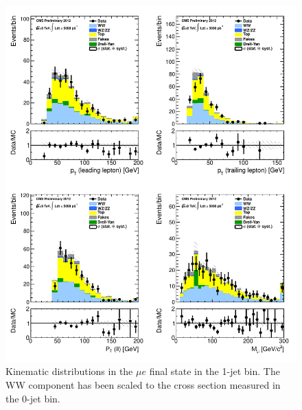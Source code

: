 \begin{figure}[!hbtp]
\centering
\includegraphics[width=1\textwidth]{figures/ww_analysis20_0_ALL_me_1j.pdf} %
\caption{Kinematic distributions in the $\mu e$ final state in the 1-jet bin.
The WW component has been scaled to the cross section measured in the 0-jet bin.}
\label{fig:xs_kinematics_me_1j}
\end{figure}
